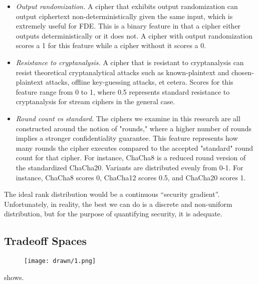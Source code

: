 \begin{itemize}

 \item \emph{Output randomization.} A cipher that exhibits output randomization
 can output ciphertext non-deterministically given the same input, which is
 extremely useful for FDE\@. This is a binary feature in that a cipher either
 outputs deterministically or it does not. A cipher with output randomization
 scores a 1 for this feature while a cipher without it scores a 0.

 \item \emph{Resistance to cryptanalysis.} A cipher that is resistant to
 cryptanalysis can resist theoretical cryptanalytical attacks such as
 known-plaintext and chosen-plaintext attacks, offline key-guessing attacks, et
 cetera. Scores for this feature range from 0 to 1, where 0.5 represents
 standard resistance to cryptanalysis for stream ciphers in the general case\@.

 \item \emph{Round count vs standard.} The ciphers we examine in this research
 are all constructed around the notion of "rounds," where a higher number of
 rounds implies a stronger confidentiality guarantee. This feature represents
 how many rounds the cipher executes compared to the accepted "standard" round
 count for that cipher. For instance, ChaCha8 is a reduced round version of the
 standardized ChaCha20. Variants are distributed evenly from 0-1. For instance,
 ChaCha8 scores 0, ChaCha12 scores 0.5, and ChaCha20 scores 1\@.

\end{itemize}

The ideal rank distribution would be a continuous “security gradient”.
Unfortunately, in reality, the best we can do is a discrete and non-uniform
distribution, but for the purpose of quantifying security, it is
adequate.

\subsection{Tradeoff Spaces}

\begin{figure}[ht]
 \centering
  \texttt{[image: drawn/1.png]}
   \caption{}\label{fig:40mb-read-frontier}
\end{figure}

 shows.

